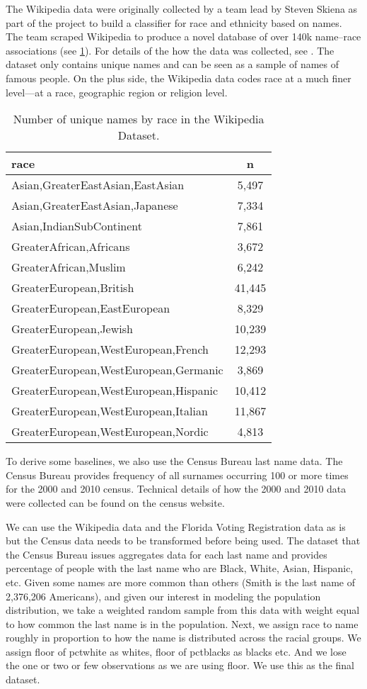 \documentclass[12pt, letterpaper]{article}
\begin{document}
The Wikipedia data were originally collected by a team lead by Steven Skiena as part of the project to build a classifier for race and ethnicity based on names. The team scraped Wikipedia to produce a novel database of over 140k name--race associations (see \ref{table:wikipedia_data}). For details of the how the data was collected, see \citet{ambekar2009name}. The dataset only contains unique names and can be seen as a sample of names of famous people. On the plus side, the Wikipedia data codes race at a much finer level---at a race, geographic region or religion level. 

\begin{table}[h!]
\centering
\caption{Number of unique names by race in the Wikipedia Dataset.}
\begin{tabular}{ l c }
\hline	
race & n \\
\hline
Asian,GreaterEastAsian,EastAsian & 5,497 \\
Asian,GreaterEastAsian,Japanese & 7,334 \\
Asian,IndianSubContinent & 7,861 \\
GreaterAfrican,Africans & 3,672 \\
GreaterAfrican,Muslim & 6,242 \\
GreaterEuropean,British & 41,445 \\
GreaterEuropean,EastEuropean & 8,329 \\
GreaterEuropean,Jewish & 10,239 \\
GreaterEuropean,WestEuropean,French & 12,293 \\
GreaterEuropean,WestEuropean,Germanic & 3,869 \\
GreaterEuropean,WestEuropean,Hispanic & 10,412 \\
GreaterEuropean,WestEuropean,Italian & 11,867 \\
GreaterEuropean,WestEuropean,Nordic & 4,813 \\
\hline
\end{tabular}
\label{table:wikipedia_data}
\end{table}

To derive some baselines, we also use the Census Bureau last name data. The Census Bureau provides frequency of all surnames occurring 100 or more times for the 2000 and 2010 census. Technical details of how the 2000 and 2010 data were collected can be found on the census website. 

We can use the Wikipedia data and the Florida Voting Registration data as is but the Census data needs to be transformed before being used. The dataset that the Census Bureau issues aggregates data for each last name and provides percentage of people with the last name who are Black, White, Asian, Hispanic, etc. Given some names are more common than others (Smith is the last name of 2,376,206 Americans), and given our interest in modeling the population distribution, we take a weighted random sample from this data with weight equal to how common the last name is in the population. Next, we assign race to name roughly in proportion to how the name is distributed across the racial groups. We assign floor of pctwhite as whites, floor of pctblacks as blacks etc. And we lose the one or two or few observations as we are using floor. We use this as the final dataset.
\end{document}
